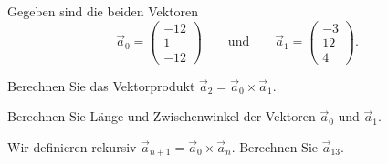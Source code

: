 Gegeben sind die beiden Vektoren
\[
\vec{a}_0
=
\begin{pmatrix}
  -12\\
    1\\
  -12
\end{pmatrix}
\qquad\text{und}\qquad
\vec{a}_1
=
\begin{pmatrix}
   -3\\
   12\\
    4
\end{pmatrix}.
\]
\begin{teilaufgaben}
\item
Berechnen Sie das Vektorprodukt $\vec{a}_2 = \vec{a}_0\times\vec{a}_1$.
\item
Berechnen Sie Länge und Zwischenwinkel der Vektoren $\vec{a}_0$ und $\vec{a}_1$.
\item
Wir definieren rekursiv
$\vec{a}_{n+1} = \vec{a}_0\times \vec{a}_n$.
Berechnen Sie $\vec{a}_{13}$.
\end{teilaufgaben}



